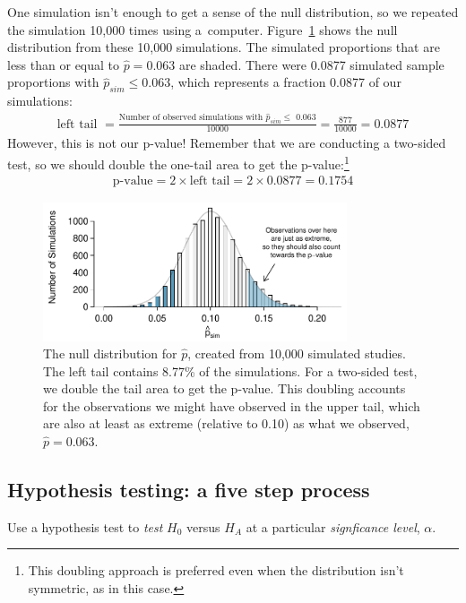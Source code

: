 One simulation isn't enough to get a sense of the null distribution, so we repeated the simulation 10,000 times using a~computer. Figure~\ref{MedConsNullSim} shows the null distribution from these 10,000 simulations. The simulated proportions that are less than or equal to $\hat{p}=0.063$ are shaded. There were 0.0877 simulated sample proportions with $\hat{p}_{sim} \leq 0.063$, which represents a fraction 0.0877 of our simulations:
\begin{align*}
\text{left tail }
	= \frac{\text{Number of observed simulations with }\hat{p}_{sim}\leq\text{ 0.063}}{10000}
	= \frac{877}{10000} = 0.0877
\end{align*}
However, this is not our p-value! Remember that we are conducting a two-sided test, so we should double the one-tail area to get the p-value:\footnote{This doubling approach is preferred even when the distribution isn't symmetric, as in this case.}
\begin{align*}
\text{p-value} = 2 \times \text{left tail} = 2 \times 0.0877 = 0.1754
\end{align*}

\begin{figure}[ht]
\centering
\includegraphics[width=0.8\textwidth]{ch_foundations_for_inf/figures/MedicalConsultant/MedConsNullSim}
\caption{The null distribution for $\hat{p}$, created from 10,000 simulated studies. The left tail contains 8.77\% of the simulations. For a two-sided test, we double the tail area to get the p-value. This doubling accounts for the observations we might have observed in the upper tail, which are also at least as extreme (relative to 0.10) as what we observed, $\hat{p} = 0.063$.}
\label{MedConsNullSim}
\end{figure}


\D{\newpage}

\subsection{Hypothesis testing: a five step process}
Use a hypothesis test to \emph{test} $H_0$ versus $H_A$ at a particular \emph{signficance level}, $\alpha$.

